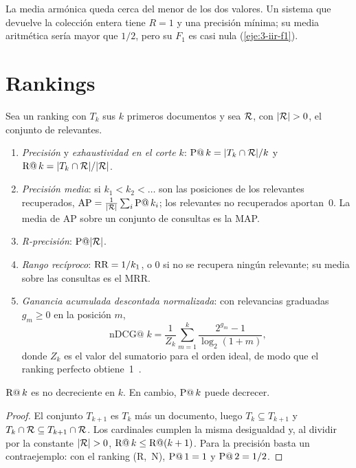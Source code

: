 La media armónica queda cerca del menor de los dos valores. Un sistema que devuelve la colección entera tiene $R=1$ y una precisión mínima; su media aritmética sería mayor que $1/2$, pero su $F_1$ es casi nula (\cref{eje:3-iir-f1}).

\section{Rankings}

\begin{definicion}\label{def:metricas-ranking}
Sea un ranking con $T_k$ sus $k$ primeros documentos y sea $\mathcal{R}$, con $\lvert\mathcal{R}\rvert>0$, el conjunto de relevantes.
\begin{enumerate}
  \item \emph{Precisión} y \emph{exhaustividad en el corte $k$}: $\operatorname{P@}k=\lvert T_k\cap\mathcal{R}\rvert/k$ y $\operatorname{R@}k=\lvert T_k\cap\mathcal{R}\rvert/\lvert\mathcal{R}\rvert$.
  \item \emph{Precisión media}: si $k_1<k_2<\dots$ son las posiciones de los relevantes recuperados, $\operatorname{AP}=\frac{1}{\lvert\mathcal{R}\rvert}\sum_i\operatorname{P@}k_i$; los relevantes no recuperados aportan~0. La media de AP sobre un conjunto de consultas es la MAP.
  \item \emph{R-precisión}: $\operatorname{P@}\lvert\mathcal{R}\rvert$.
  \item \emph{Rango recíproco}: $\operatorname{RR}=1/k_1$, o $0$ si no se recupera ningún relevante; su media sobre las consultas es el MRR.
  \item \emph{Ganancia acumulada descontada normalizada}: con relevancias graduadas $g_m\ge 0$ en la posición $m$,
  \[
  \operatorname{nDCG@}k=\frac{1}{Z_k}\sum_{m=1}^{k}\frac{2^{g_m}-1}{\log_2(1+m)},
  \]
  donde $Z_k$ es el valor del sumatorio para el orden ideal, de modo que el ranking perfecto obtiene~1~\cite[§8.4]{iir}.
\end{enumerate}
\end{definicion}

\begin{proposicion}[Monotonía]\label{prop:monotonia}
$\operatorname{R@}k$ es no decreciente en $k$. En cambio, $\operatorname{P@}k$ puede decrecer.
\end{proposicion}

\begin{proof}
El conjunto $T_{k+1}$ es $T_k$ más un documento, luego $T_k\subseteq T_{k+1}$ y $T_k\cap\mathcal{R}\subseteq T_{k+1}\cap\mathcal{R}$. Los cardinales cumplen la misma desigualdad y, al dividir por la constante $\lvert\mathcal{R}\rvert>0$, $\operatorname{R@}k\le\operatorname{R@}(k+1)$. Para la precisión basta un contraejemplo: con el ranking (R,~N), $\operatorname{P@}1=1$ y $\operatorname{P@}2=1/2$.
\end{proof}

